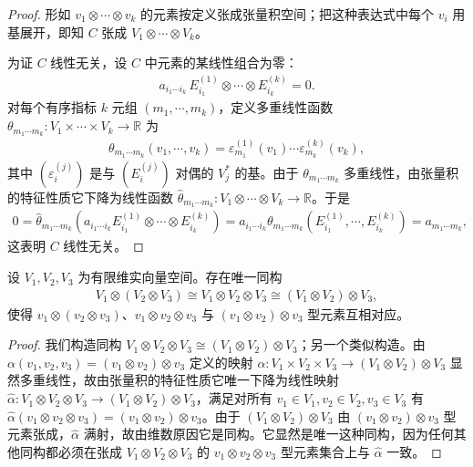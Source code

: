 \documentclass[../../main.tex]{subfiles}
\begin{document}
\begin{proof}
形如 $v_1\otimes\cdots\otimes v_k$ 的元素按定义张成张量积空间；把这种表达式中每个 $v_i$ 用基展开，即知 $C$ 张成 $V_1\otimes\cdots\otimes V_k$。

为证 $C$ 线性无关，设 $C$ 中元素的某线性组合为零：
\begin{align*}
a_{i_1\cdots  i_k}\,E^{(1)}_{i_1}\otimes\cdots\otimes E^{(k)}_{i_k}=0.
\end{align*}
对每个有序指标 $k$ 元组 $(m_1,\cdots ,m_k)$，定义多重线性函数 $\theta_{m_1\cdots  m_k}\colon V_1\times\cdots\times V_k\to\mathbb{R}$ 为
\begin{align*}
\theta_{m_1\cdots  m_k}(v_1,\cdots ,v_k)=\varepsilon^{(1)}_{m_1}(v_1)\cdots\varepsilon^{(k)}_{m_k}(v_k),
\end{align*}
其中 $(\varepsilon^{(j)}_i)$ 是与 $(E^{(j)}_i)$ 对偶的 $V_j^*$ 的基。由于 $\theta_{m_1\cdots  m_k}$ 多重线性，由张量积的特征性质它下降为线性函数 $\widehat\theta_{m_1\cdots  m_k}\colon V_1\otimes\cdots\otimes V_k\to\mathbb{R}$。于是
\begin{align*}
0=\widehat\theta_{m_1\cdots  m_k}\left(a_{i_1\cdots  i_k}E^{(1)}_{i_1}\otimes\cdots\otimes E^{(k)}_{i_k}\right)
=a_{i_1\cdots  i_k}\theta_{m_1\cdots  m_k}(E^{(1)}_{i_1},\cdots ,E^{(k)}_{i_k})=a_{m_1\cdots  m_k},
\end{align*}
这表明 $C$ 线性无关。
\end{proof}

\begin{proposition}[张量积空间的结合性]\label{proposition:ch12-张量积结合}
设 $V_1,V_2,V_3$ 为有限维实向量空间。存在唯一同构
\begin{align*}
V_1\otimes(V_2\otimes V_3)\cong V_1\otimes V_2\otimes V_3\cong(V_1\otimes V_2)\otimes V_3,
\end{align*}
使得 $v_1\otimes(v_2\otimes v_3)$、$v_1\otimes v_2\otimes v_3$ 与 $(v_1\otimes v_2)\otimes v_3$ 型元素互相对应。
\end{proposition}

\begin{proof}
我们构造同构 $V_1\otimes V_2\otimes V_3\cong(V_1\otimes V_2)\otimes V_3$；另一个类似构造。由 $\alpha(v_1,v_2,v_3)=(v_1\otimes v_2)\otimes v_3$ 定义的映射 $\alpha\colon V_1\times V_2\times V_3\to(V_1\otimes V_2)\otimes V_3$ 显然多重线性，故由张量积的特征性质它唯一下降为线性映射 $\widehat\alpha\colon V_1\otimes V_2\otimes V_3\to(V_1\otimes V_2)\otimes V_3$，满足对所有 $v_1\in V_1,v_2\in V_2,v_3\in V_3$ 有 $\widehat\alpha(v_1\otimes v_2\otimes v_3)=(v_1\otimes v_2)\otimes v_3$。由于 $(V_1\otimes V_2)\otimes V_3$ 由 $(v_1\otimes v_2)\otimes v_3$ 型元素张成，$\widehat\alpha$ 满射，故由维数原因它是同构。它显然是唯一这种同构，因为任何其他同构都必须在张成 $V_1\otimes V_2\otimes V_3$ 的 $v_1\otimes v_2\otimes v_3$ 型元素集合上与 $\widehat\alpha$ 一致。
\end{proof}
\end{document}
